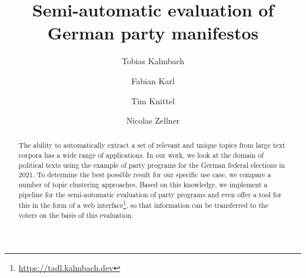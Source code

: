 \documentclass[sigconf,nonacm, 11pt]{acmart}
\begin{document}
\title{Semi-automatic evaluation of German party manifestos}

\author{Tobias Kalmbach}

\author{Fabian Karl}

\author{Tim Knittel}

\author{Nicolas Zellner}

\renewcommand{\shortauthors}{T.Kalmbach, F.Karl, T.Knittel, N.Zellner}

\begin{abstract}
    The ability to automatically extract a set of relevant and unique topics from large text corpora has a wide range of applications. In our work, we look at the domain of political texts using the example of party programs for the German federal elections in 2021. To determine the best possible result for our specific use case, we compare a number of topic clustering approaches. 
    Based on this knowledge, we implement a pipeline for the semi-automatic evaluation of party programs and even offer a tool for this in the form of a web interface\footnote{\url{https://tadl.kalmbach.dev}}, so that information can be transferred  to the voters on the basis of this evaluation.
\end{abstract}





\maketitle
\end{document}
